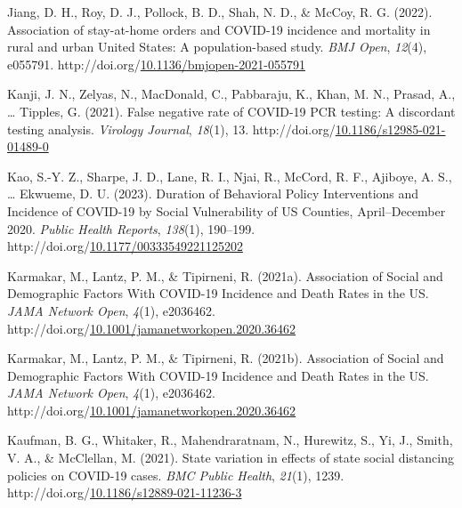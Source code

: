 \documentclass[12pt,twoside]{smiththesis}
\newlength{\cslhangindent}
\newenvironment{CSLReferences}[2] %
 {%
\setlength{\parindent}{0pt}
\ifodd #1 \everypar{\setlength{\hangindent}{\cslhangindent}}\ignorespaces\fi
\ifnum #2 > 0
\setlength{\parskip}{#2\baselineskip}
  \fi
}%
{}
\begin{document}
\begin{CSLReferences}{1}{0}
\leavevmode{}%
Jiang, D. H., Roy, D. J., Pollock, B. D., Shah, N. D., \& McCoy, R. G. (2022). Association of stay-at-home orders and {COVID-19} incidence and mortality in rural and urban {United States}: A population-based study. \emph{BMJ Open}, \emph{12}(4), e055791. http://doi.org/\href{https://doi.org/10.1136/bmjopen-2021-055791}{10.1136/bmjopen-2021-055791}

\leavevmode{}%
Kanji, J. N., Zelyas, N., MacDonald, C., Pabbaraju, K., Khan, M. N., Prasad, A., \ldots{} Tipples, G. (2021). False negative rate of {COVID-19 PCR} testing: A discordant testing analysis. \emph{Virology Journal}, \emph{18}(1), 13. http://doi.org/\href{https://doi.org/10.1186/s12985-021-01489-0}{10.1186/s12985-021-01489-0}

\leavevmode{}%
Kao, S.-Y. Z., Sharpe, J. D., Lane, R. I., Njai, R., McCord, R. F., Ajiboye, A. S., \ldots{} Ekwueme, D. U. (2023). Duration of {Behavioral Policy Interventions} and {Incidence} of {COVID-19} by {Social Vulnerability} of {US Counties}, {April}--{December} 2020. \emph{Public Health Reports}, \emph{138}(1), 190--199. http://doi.org/\href{https://doi.org/10.1177/00333549221125202}{10.1177/00333549221125202}

\leavevmode{}%
Karmakar, M., Lantz, P. M., \& Tipirneni, R. (2021a). Association of {Social} and {Demographic Factors With COVID-19 Incidence} and {Death Rates} in the {US}. \emph{JAMA Network Open}, \emph{4}(1), e2036462. http://doi.org/\href{https://doi.org/10.1001/jamanetworkopen.2020.36462}{10.1001/jamanetworkopen.2020.36462}

\leavevmode{}%
Karmakar, M., Lantz, P. M., \& Tipirneni, R. (2021b). Association of {Social} and {Demographic Factors With COVID-19 Incidence} and {Death Rates} in the {US}. \emph{JAMA Network Open}, \emph{4}(1), e2036462. http://doi.org/\href{https://doi.org/10.1001/jamanetworkopen.2020.36462}{10.1001/jamanetworkopen.2020.36462}

\leavevmode{}%
Kaufman, B. G., Whitaker, R., Mahendraratnam, N., Hurewitz, S., Yi, J., Smith, V. A., \& McClellan, M. (2021). State variation in effects of state social distancing policies on {COVID-19} cases. \emph{BMC Public Health}, \emph{21}(1), 1239. http://doi.org/\href{https://doi.org/10.1186/s12889-021-11236-3}{10.1186/s12889-021-11236-3}


\end{CSLReferences}
\end{document}
